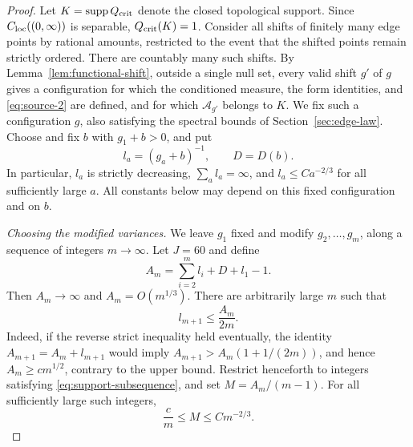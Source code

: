 \begin{proof}
Let $K=\operatorname{supp} Q_{\rm crit}$ denote the closed topological support.
Since $C_{\rm loc}((0,\infty))$ is separable, $Q_{\rm crit}(K)=1$.
Consider all shifts of finitely many edge points by rational amounts,
restricted to the event that the shifted points remain strictly ordered.
There are countably many such shifts.  By
Lemma~\ref{lem:functional-shift}, outside a single null set, every valid
shift $g'$ of $g$ gives a configuration for which the conditioned measure,
the form identities, and \eqref{eq:source-2} are defined, and for which
$\mathcal A_{g'}$ belongs to $K$.  We fix such a configuration $g$, also
satisfying the spectral bounds of Section~\ref{sec:edge-law}.
Choose and fix $b$ with $g_1+b>0$, and put
\[
 l_a=(g_a+b)^{-1},\qquad D=D(b).
\]
In particular, $l_a$ is strictly decreasing,
$\sum_a l_a=\infty$, and $l_a\le C a^{-2/3}$ for all sufficiently
large $a$.  All constants below may depend on this fixed configuration
and on $b$.

\medskip\noindent
\emph{Choosing the modified variances.}
We leave $g_1$ fixed and modify $g_2,\ldots,g_m$, along a sequence
of integers $m\to\infty$.  Let $J=60$ and define
\[
 A_m=\sum_{i=2}^m l_i+D+l_1-1.
\]
Then $A_m\to\infty$ and $A_m=O(m^{1/3})$.  There are arbitrarily
large $m$ such that
\begin{equation}\label{eq:support-subsequence}
 l_{m+1}\le \frac{A_m}{2m}.
\end{equation}
Indeed, if the reverse strict inequality held eventually, the identity
$A_{m+1}=A_m+l_{m+1}$ would imply
$A_{m+1}>A_m(1+1/(2m))$, and hence $A_m\ge c m^{1/2}$,
contrary to the upper bound.  Restrict henceforth to integers satisfying
\eqref{eq:support-subsequence}, and set $M=A_m/(m-1)$.  For all
sufficiently large such integers,
\begin{equation}\label{eq:support-scale}
 \frac{c}{m}\le M\le C m^{-2/3}.
\end{equation}


\end{proof}
